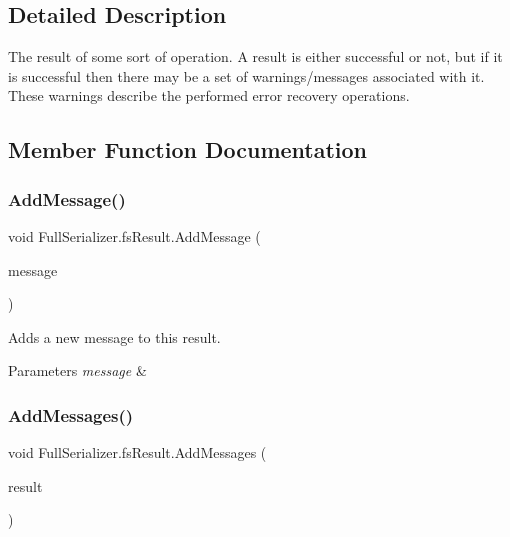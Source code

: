 \subsection{Detailed Description}
The result of some sort of operation. A result is either successful or not, but if it is successful then there may be a set of warnings/messages associated with it. These warnings describe the performed error recovery operations. 



\subsection{Member Function Documentation}
\mbox{\label{struct_full_serializer_1_1fs_result_afe5ac00b5b1c6b4863a4a7870cbbd066}} 
\subsubsection{\texorpdfstring{Add\+Message()}{AddMessage()}}
{\footnotesize\ttfamily void Full\+Serializer.\+fs\+Result.\+Add\+Message (\begin{DoxyParamCaption}\item[{string}]{message }\end{DoxyParamCaption})\hspace{0.3cm}{\ttfamily [inline]}}



Adds a new message to this result. 


\begin{DoxyParams}{Parameters}
{\em message} & \\
\hline
\end{DoxyParams}
\mbox{\label{struct_full_serializer_1_1fs_result_a7aff2b2f78db0d8e0b9e0daeb08a8f70}} 
\subsubsection{\texorpdfstring{Add\+Messages()}{AddMessages()}}
{\footnotesize\ttfamily void Full\+Serializer.\+fs\+Result.\+Add\+Messages (\begin{DoxyParamCaption}\item[{\hyperlink{struct_full_serializer_1_1fs_result}{fs\+Result}}]{result }\end{DoxyParamCaption})\hspace{0.3cm}{\ttfamily [inline]}}



